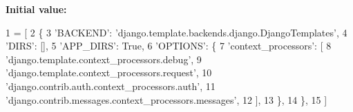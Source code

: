 {\bfseries Initial value\-:}
\begin{DoxyCode}
1 = [
2     \{
3         \textcolor{stringliteral}{'BACKEND'}: \textcolor{stringliteral}{'django.template.backends.django.DjangoTemplates'},
4         \textcolor{stringliteral}{'DIRS'}: [],
5         \textcolor{stringliteral}{'APP\_DIRS'}: \textcolor{keyword}{True},
6         \textcolor{stringliteral}{'OPTIONS'}: \{
7             \textcolor{stringliteral}{'context\_processors'}: [
8                 \textcolor{stringliteral}{'django.template.context\_processors.debug'},
9                 \textcolor{stringliteral}{'django.template.context\_processors.request'},
10                 \textcolor{stringliteral}{'django.contrib.auth.context\_processors.auth'},
11                 \textcolor{stringliteral}{'django.contrib.messages.context\_processors.messages'},
12             ],
13         \},
14     \},
15 ]
\end{DoxyCode}
